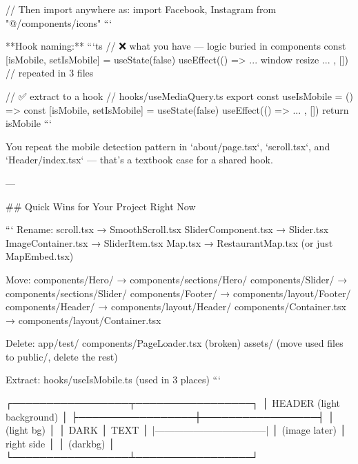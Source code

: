 // Then import anywhere as:
import { Facebook, Instagram } from "@/components/icons"
```

**Hook naming:**
```ts
// ❌ what you have — logic buried in components
const [isMobile, setIsMobile] = useState(false)
useEffect(() => { ... window resize ... }, [])  // repeated in 3 files

// ✅ extract to a hook
// hooks/useMediaQuery.ts
export const useIsMobile = () => {
  const [isMobile, setIsMobile] = useState(false)
  useEffect(() => { ... }, [])
  return isMobile
}
```

You repeat the mobile detection pattern in `about/page.tsx`, `scroll.tsx`, and `Header/index.tsx` — that's a textbook case for a shared hook.

---

## Quick Wins for Your Project Right Now

```
Rename:
  scroll.tsx          → SmoothScroll.tsx
  SliderComponent.tsx → Slider.tsx
  ImageContainer.tsx  → SliderItem.tsx
  Map.tsx             → RestaurantMap.tsx (or just MapEmbed.tsx)

Move:
  components/Hero/    → components/sections/Hero/
  components/Slider/  → components/sections/Slider/
  components/Footer/  → components/layout/Footer/
  components/Header/  → components/layout/Header/
  components/Container.tsx → components/layout/Container.tsx

Delete:
  app/test/
  components/PageLoader.tsx (broken)
  assets/ (move used files to public/, delete the rest)

Extract:
  hooks/useIsMobile.ts  (used in 3 places)
```


┌─────────────────┬─────────────────┐
│   HEADER (light background)       │
├─────────────────┼─────────────────┤
│           (light bg)              │
│   DARK          │   TEXT          │
|-----------------------------------|
│   (image later) │   right side    │
│              (darkbg)             │
└─────────────────┴─────────────────┘